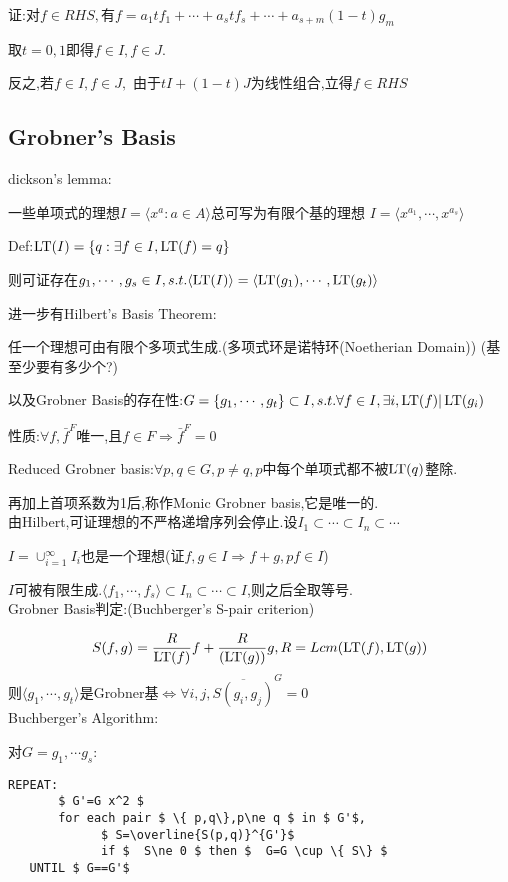证:对$ f\in RHS,$有$ f=a_1tf_1+\cdots+a_stf_s+\cdots+a_{s+m}(1-t)g_m$

取$ t=0,1$即得$ f\in I,f\in J$.

反之,若$ f\in I,f\in J,$ 由于$ tI+(1-t)J$为线性组合,立得$ f\in RHS$

\subsection{Grobner's Basis}
dickson's lemma:

一些单项式的理想$ I= \langle x^a : a\in A \rangle $总可写为有限个基的理想
$ I= \langle x^{a_1},\cdots,x^{a_s} \rangle $

Def:$ \operatorname{\tiny{LT}}(I)=\{q: \exists f \in I,\operatorname{\tiny{LT}}(f)=q\}$

则可证存在$ g_1,\cdots,g_s\in I,s.t.  \langle \operatorname{\tiny{LT}}(I) \rangle = \langle \operatorname{\tiny{LT}}(g_1),\cdots,\operatorname{\tiny{LT}}(g_t) \rangle $

进一步有Hilbert's Basis Theorem:

任一个理想可由有限个多项式生成.(多项式环是诺特环(Noetherian Domain))   (基至少要有多少个?)

以及Grobner Basis的存在性:$ G=\{g_1,\cdots,g_t\}\subset I,s.t.\forall f\in I,\exists i, \operatorname{\tiny{LT}}(f)|\operatorname{\tiny{LT}}(g_i)$

性质:$ \forall f,\bar{f}^F$唯一,且$ f\in F\Rightarrow \bar{f}^F=0$

Reduced Grobner basis:$ \forall p,q\in G,p\ne q,p$中每个单项式都不被$ \operatorname{\tiny{LT}}(q)$整除.

再加上首项系数为1后,称作Monic Grobner basis,它是唯一的.
\\

由Hilbert,可证理想的不严格递增序列会停止.设$ I_1\subset\cdots\subset I_n\subset\cdots$

$ I=\cup_{i=1}^{\infty}I_i$也是一个理想(证$ f,g\in I \Rightarrow f+g,pf\in I$)

$ I$可被有限生成.$  \langle f_1,\cdots,f_s \rangle \subset I_n\subset\cdots \subset I$,则之后全取等号.
\\

Grobner Basis判定:(Buchberger's S-pair criterion)

\[  S(f,g)=\dfrac{R}{\operatorname{\tiny{LT}}(f)}f+\dfrac{R}{(\operatorname{\tiny{LT}}(g))}g,R=Lcm(\operatorname{\tiny{LT}} (f),\operatorname{\tiny{LT}} (g))\]
则$  \langle g_1,\cdots,g_t \rangle $是Grobner基$ \Leftrightarrow \forall i,j,\overline{S(g_i,g_j)}^G=0$
\\

Buchberger's Algorithm:

对$ G={g_1,\cdots g_s}$:

\begin{lstlisting}[mathescape]
   REPEAT:
       $ G'=G x^2 $
       for each pair $ \{ p,q\},p\ne q $ in $ G'$,
             $ S=\overline{S(p,q)}^{G'}$
             if $  S\ne 0 $ then $  G=G \cup \{ S\} $
   UNTIL $ G==G'$
\end{lstlisting}


